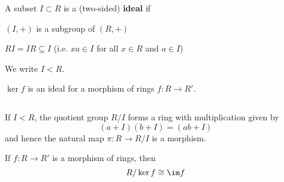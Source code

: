 \begin{defn}
	A subset $I \subset R$ is a (two-sided) \textbf{ideal} if
	\begin{enum}
		\item $(I,+)$ is a subgroup of $(R,+)$
		\item $RI = IR \subseteq I$ (i.e. $xa \in I$ for all $x \in R$ and $a \in I$)
	\end{enum}
	We write $I<R$.
\end{defn}

\begin{exam}
	$\ker f$ is an ideal for a morphism of rings $f: R \to R'$.
\end{exam}

\begin{exer}$ $\\
	\begin{itm}
		\item If $I<R$, the quotient group $R/I$ forms a ring with multiplication given by
		\[(a+I)(b+I)=(ab+I)\]
		and hence the natural map $\pi: R \to R/I$ is a morphism.
		\item If $f: R \to R'$ is a morphism of rings, then
		\[R/\ker f \cong \im f\]
	\end{itm}
\end{exer}

